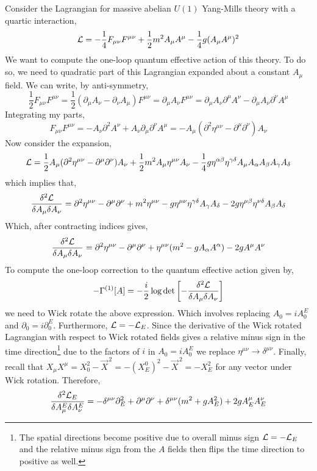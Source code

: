 \documentclass[12pt]{article}
\begin{document}
Consider the Lagrangian for massive abelian $U(1)$ Yang-Mills theory with a quartic interaction,
\[ \mathcal{L} = - \frac{1}{4} F_{\mu \nu} F^{\mu \nu} + \frac{1}{2} m^2 A_\mu A^{\mu} - \frac{1}{4} g (A_\mu A^\mu)^2 \]
We want to compute the one-loop quantum effective action of this theory. To do so, we need to quadratic part of this Lagrangian expanded about a constant $A_{\mu}$ field.
We can write, by anti-symmetry,
\[ \frac{1}{2} F_{\mu \nu} F^{\mu \nu} = \frac{1}{2} (\partial_\mu A_\nu - \partial_\nu A_\mu) F^{\mu \nu} = \partial_\mu A_\nu F^{\mu \nu} = \partial_\mu A_\nu \partial^\mu A^\nu - \partial_\mu A_{\nu} \partial^\nu A^\mu  \]
Integrating my parts,
\[  F_{\mu \nu} F^{\mu \nu} = - A_\nu \partial^2 A^\nu + A_\nu \partial_\mu \partial^\nu A^\mu = - A_\mu(\partial^2 \eta^{\mu \nu} - \partial^\mu \partial^\nu) A_\nu \]
Now consider the expansion,
\[ \mathcal{L} = \frac{1}{2} A_\mu (\partial^2 \eta^{\mu \nu} - \partial^\mu \partial^\nu) A_\nu + \frac{1}{2} m^2 A_\mu \eta^{\mu \nu} A_{\nu} - \frac{1}{4} g \eta^{\alpha \beta} \eta^{\gamma \delta} A_\mu A_{\alpha} A_{\beta} A_{\gamma} A_{\delta} \]
which implies that,
\[ \frac{\delta^2 \mathcal{L}}{\delta A_\mu \delta A_{\nu}} = \partial^2 \eta^{\mu \nu} - \partial^\mu \partial^\nu + m^2 \eta^{\mu \nu} - g \eta^{\mu \nu} \eta^{\gamma \delta} A_{\gamma} A_{\delta} - 2 g \eta^{\mu \beta} \eta^{\nu \delta} A_{\beta} A_{\delta} \]
Which, after contracting indices gives,
\[ \frac{\delta^2 \mathcal{L}}{\delta A_\mu \delta A_{\nu}} = \partial^2 \eta^{\mu \nu} - \partial^\mu \partial^\nu + \eta^{\mu \nu} (m^2 - g A_{\alpha} A^{\alpha}) - 2 g A^{\mu} A^{\nu} \]
To compute the one-loop correction to the quantum effective action given by,
\[ - \Gamma^{(1)}[A] = - \frac{i}{2} \log{\det{\left[ -  \frac{\delta^2 \mathcal{L}}{\delta A_\mu \delta A_{\nu}} \right]}} \]
we need to Wick rotate the above expression. Which involves replacing $A_0 = i A_0^{E}$ and $\partial_0 = i \partial_0^E$. Furthermore, $\mathcal{L} = - \mathcal{L}_E$. Since the derivative of the Wick rotated Lagrangian with respect to Wick rotated fields gives a relative minus sign in the time direction\footnote{The spatial directions become positive due to overall minus sign $\mathcal{L} = - \mathcal{L}_E$ and the relative minus sign from the $A$ fields then flips the time direction to positive as well.} due to the factors of $i$ in $A_0 = i A_0^E$ we replace $\eta^{\mu \nu} \to \delta^{\mu \nu}$. Finally, recall that $X_\mu X^{\mu} = X_0^2 - \vec{X}^{\, 2} = - (X^0_E)^2 - \vec{X}^{\, 2} = - X_E^2$ for any vector under Wick rotation. Therefore,
\[ \frac{\delta^2 \mathcal{L}_E}{\delta A^E_\mu \delta A^E_\nu} = - \delta^{\mu \nu} \partial_E^2 + \partial^\mu \partial^\nu + \delta^{\mu \nu} (m^2 + g A_E^2) + 2 g A^\mu_E A^{\nu}_E \]  
\end{document}
